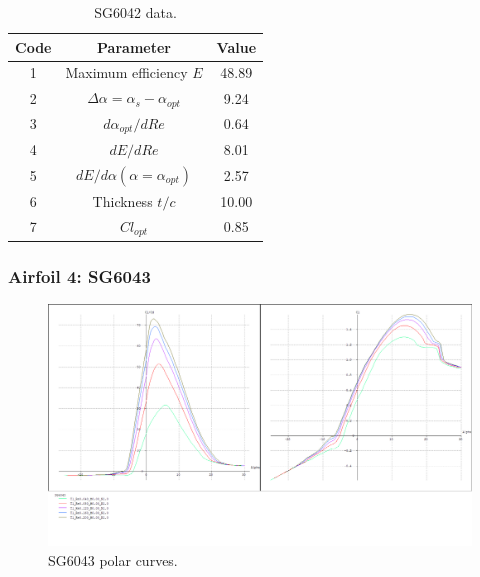 \documentclass[../TFG_Annex.tex]{subfiles}
\begin{document}
\begin{table}[h!]
	\centering
	\begin{tabular}{c|c|c}
		Code & Parameter                                    & Value  \\ \hline
		1    & Maximum efficiency $E$                      &      48.89          \\
		2    & $\Delta \alpha=\alpha_{s}-\alpha_{opt}$    &            9.24         \\
		3    & ${d\alpha_{opt}}/{dRe}$                     &               0.64    \\
		4    & ${dE}/{dRe}$                                &          8.01          \\
		5    & ${dE}/{d \alpha} (\alpha=\alpha_{opt})$      &        2.57          \\
		6    & Thickness $t/c$                            &           10.00         \\
		7    & $Cl_{opt}$  & 0.85
	\end{tabular}
	\caption{SG6042 data.}
	\label{tab:Airf3}
\end{table}





\newpage
\subsubsection{Airfoil 4: SG6043}


\begin{figure}[h!]
	\centering
	\includegraphics[width=1\linewidth]{"../../04-Airfoil selection/Imatges airfoils/4-SG6043"}
	\caption{SG6043 polar curves.}
	\label{fig:4-sg6043}
\end{figure}
\end{document}

